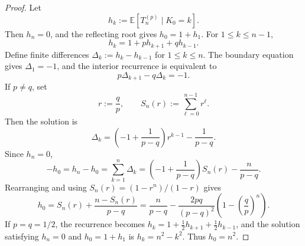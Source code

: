\documentclass{article}
\numberwithin{theorem}{section}
\numberwithin{proposition}{section}
\numberwithin{corollary}{section}
\numberwithin{lemma}{section}
\numberwithin{conjecture}{section}
\numberwithin{remark}{section}
\numberwithin{definition}{section}
\numberwithin{assumption}{section}
\numberwithin{example}{section}
\newcommand{\bbE}{\mathbb{E}}
\newcommand{\lbra}[1]{\left[#1\right]}
\newcommand{\sbra}[1]{\left(#1\right)}
\begin{document}
\begin{proof}
Let
\begin{equation*}
    h_k:=\bbE\lbra{T_n^{(p)}\mid K_0=k}.
\end{equation*}
Then $h_n=0$, and the reflecting root gives $h_0=1+h_1$. For $1\le k\le n-1$,
\begin{equation*}
    h_k=1+p h_{k+1}+q h_{k-1}.
\end{equation*}
Define finite differences $\Delta_k:=h_k-h_{k-1}$ for $1\le k\le n$. The boundary equation gives $\Delta_1=-1$, and the interior recurrence is equivalent to
\begin{equation*}
    p\Delta_{k+1}-q\Delta_k=-1.
\end{equation*}
If $p\ne q$, set
\begin{equation*}
    r:=\frac{q}{p}, \qquad S_n(r):=\sum_{\ell=0}^{n-1}r^\ell.
\end{equation*}
Then the solution is
\begin{equation*}
    \Delta_k=\sbra{-1+\frac{1}{p-q}}r^{k-1}-\frac{1}{p-q}.
\end{equation*}
Since $h_n=0$,
\begin{equation*}
    -h_0=h_n-h_0=\sum_{k=1}^{n}\Delta_k
    =
    \sbra{-1+\frac{1}{p-q}}S_n(r)-\frac{n}{p-q}.
\end{equation*}
Rearranging and using $S_n(r)=\sbra{1-r^n}/\sbra{1-r}$ gives
\begin{equation*}
    h_0
    =
    S_n(r)+\frac{n-S_n(r)}{p-q}
    =
    \frac{n}{p-q}
    -
    \frac{2pq}{(p-q)^2}\sbra{1-\sbra{\frac{q}{p}}^n}.
\end{equation*}
If $p=q=1/2$, the recurrence becomes $h_k=1+\frac12h_{k+1}+\frac12h_{k-1}$, and the solution satisfying $h_n=0$ and $h_0=1+h_1$ is $h_k=n^2-k^2$. Thus $h_0=n^2$.


\end{proof}
\end{document}
